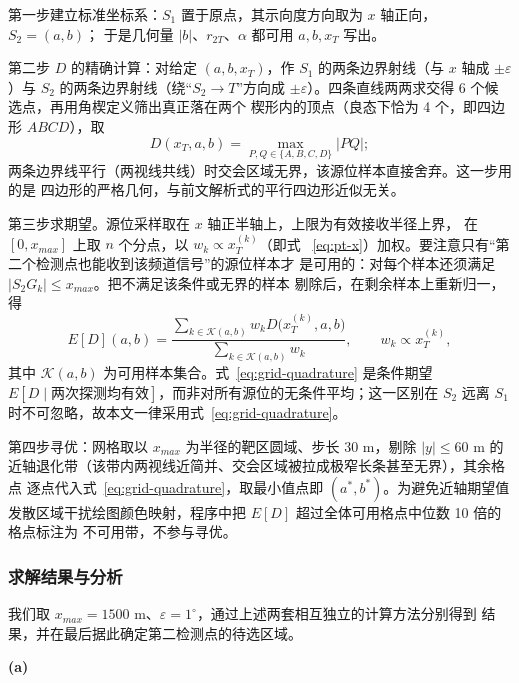 第一步建立标准坐标系：$S_1$ 置于原点，其示向度方向取为 $x$ 轴正向，$S_2=(a,b)$；
于是几何量 $|b|$、$r_{2T}$、$\alpha$ 都可用 $a,b,x_T$ 写出。

第二步 $D$ 的精确计算：对给定 $(a,b,x_T)$，作 $S_1$ 的两条边界射线（与 $x$ 轴成
$\pm\varepsilon$）与 $S_2$ 的两条边界射线（绕“$S_2\!\to\!T$”方向成
$\pm\varepsilon$）。四条直线两两求交得 6 个候选点，再用角楔定义筛出真正落在两个
楔形内的顶点（良态下恰为 4 个，即四边形 $ABCD$），取
\begin{equation}
    D(x_T,a,b)=\max_{P,Q\in\{A,B,C,D\}}|PQ| ;
    \label{eq:grid-diameter}
\end{equation}
两条边界线平行（两视线共线）时交会区域无界，该源位样本直接舍弃。这一步用的是
四边形的严格几何，与前文解析式的平行四边形近似无关。

第三步求期望。源位采样取在 $x$ 轴正半轴上，上限为有效接收半径上界，
在 $[0,x_{max}]$ 上取 $n$ 个分点，以 $w_k\propto x_T^{(k)}$（即式
~\eqref{eq:pt-x}）加权。要注意只有“第二个检测点也能收到该频道信号”的源位样本才
是可用的：对每个样本还须满足 $|S_2G_k|\le x_{max}$。把不满足该条件或无界的样本
剔除后，在{\heiti 剩余样本}\songti 上重新归一，得
\begin{equation}
    E[D](a,b)=\frac{\sum_{k\in\mathcal{K}(a,b)}w_kD\bigl(x_T^{(k)},a,b\bigr)}
    {\sum_{k\in\mathcal{K}(a,b)}w_k},
    \qquad w_k\propto x_T^{(k)},
    \label{eq:grid-quadrature}
\end{equation}
其中 $\mathcal{K}(a,b)$ 为可用样本集合。式~\eqref{eq:grid-quadrature} 是条件期望
$E[D\mid\text{两次探测均有效}]$，而非对所有源位的无条件平均；这一区别在
$S_2$ 远离 $S_1$ 时不可忽略，故本文一律采用式~\eqref{eq:grid-quadrature}。

第四步寻优：网格取以 $x_{max}$ 为半径的靶区圆域、步长 30 m，剔除 $|y|\le60$ m
的近轴退化带（该带内两视线近简并、交会区域被拉成极窄长条甚至无界），其余格点
逐点代入式~\eqref{eq:grid-quadrature}，取最小值点即 $(a^*,b^*)$。为避免近轴期望值
发散区域干扰绘图颜色映射，程序中把 $E[D]$ 超过全体可用格点中位数 10 倍的格点标注为
不可用带，不参与寻优。

\subsubsection{求解结果与分析}

我们取 $x_{max}=1500$ m、$\varepsilon=1^\circ$，通过上述两套相互独立的计算方法分别得到
结果，并在最后据此确定第二检测点的待选区域。


\noindent\textbf{(a)}\hspace{0.2em}{\heiti 理论解计算结果}\songti


